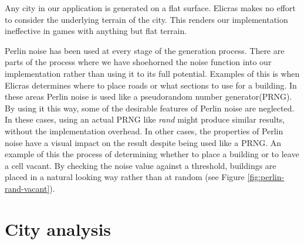 Any city in our application is generated on a flat surface. Elicras makes no effort to consider the underlying terrain of the city. This renders our implementation ineffective in games with anything but flat terrain.
\par
Perlin noise has been used at every stage of the generation process. There are parts of the process where we have shoehorned the noise function into our implementation rather than using it to its full potential. Examples of this is when Elicras determines where to place roads or what sections to use for a building. In these areas Perlin noise is used like a pseudorandom number generator(PRNG). By using it this way, some of the desirable features of Perlin noise are neglected. In these cases, using an actual PRNG like \textit{rand}\cite{RandCRT} might produce similar results, without the implementation overhead. In other cases, the properties of Perlin noise have a visual impact on the result despite being used like a PRNG. An example of this the process of determining whether to place a building or to leave a cell vacant. By checking the noise value against a threshold, buildings are placed in a natural looking way rather than at random (see Figure \ref{fig:perlin-rand-vacant}).
	
\section{City analysis}